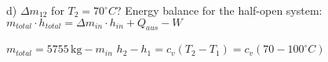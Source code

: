 d) \( \Delta m_{12} \) for \( T_2 = 70^\circ C \)?  
Energy balance for the half-open system:  
\( m_{total} \cdot h_{total} = \Delta m_{in} \cdot h_{in} + Q_{aus} - W \)  

\( m_{total} = 5755 \, \text{kg} - m_{in} \)  
\( h_2 - h_1 = c_v (T_2 - T_1) = c_v (70 - 100^\circ C) \)